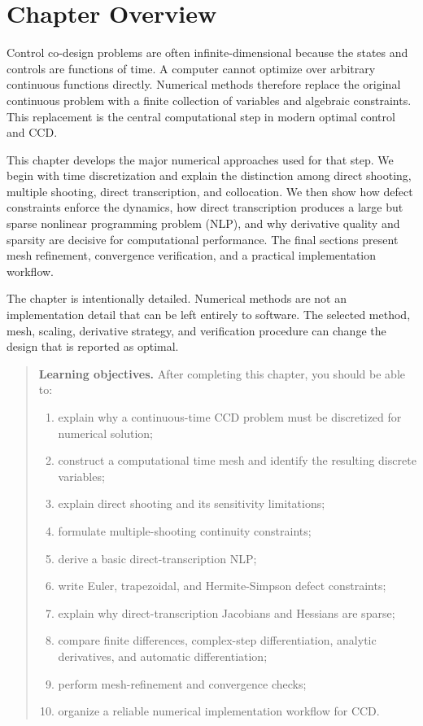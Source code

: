 \documentclass[11pt]{article}
\newenvironment{learningobjectives}{%
\begin{quote}\textbf{Learning objectives.} After completing this chapter, you should be able to:
\begin{enumerate}[leftmargin=1.4em,itemsep=0.35em,topsep=0.5em]
}{\end{enumerate}\end{quote}}
\begin{document}
\tableofcontents
\newpage

\section*{Chapter Overview}

Control co-design problems are often infinite-dimensional because the states and controls are functions of time. A computer cannot optimize over arbitrary continuous functions directly. Numerical methods therefore replace the original continuous problem with a finite collection of variables and algebraic constraints. This replacement is the central computational step in modern optimal control and CCD.

This chapter develops the major numerical approaches used for that step. We begin with time discretization and explain the distinction among direct shooting, multiple shooting, direct transcription, and collocation. We then show how defect constraints enforce the dynamics, how direct transcription produces a large but sparse nonlinear programming problem (NLP), and why derivative quality and sparsity are decisive for computational performance. The final sections present mesh refinement, convergence verification, and a practical implementation workflow.

The chapter is intentionally detailed. Numerical methods are not an implementation detail that can be left entirely to software. The selected method, mesh, scaling, derivative strategy, and verification procedure can change the design that is reported as optimal.

\begin{learningobjectives}
  \item explain why a continuous-time CCD problem must be discretized for numerical solution;
  \item construct a computational time mesh and identify the resulting discrete variables;
  \item explain direct shooting and its sensitivity limitations;
  \item formulate multiple-shooting continuity constraints;
  \item derive a basic direct-transcription NLP;
  \item write Euler, trapezoidal, and Hermite-Simpson defect constraints;
  \item explain why direct-transcription Jacobians and Hessians are sparse;
  \item compare finite differences, complex-step differentiation, analytic derivatives, and automatic differentiation;
  \item perform mesh-refinement and convergence checks;
  \item organize a reliable numerical implementation workflow for CCD.
\end{learningobjectives}
\end{document}
